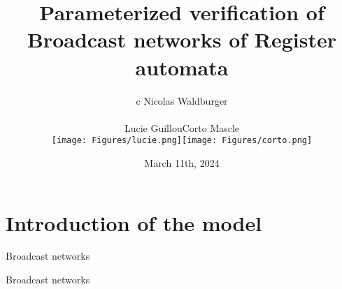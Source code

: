 \documentclass{beamer}
\begin{document}
	\title[Parameterized verification of BNRA]{Parameterized verification of Broadcast networks of Register automata}
	\date[]{March 11th, 2024\vspace{-0.5cm}}
	\author[Nicolas Waldburger]{\begin{tabular}{c} Nicolas Waldburger \\
		 \begin{tabular}{ccc}
		Lucie Guillou & Corto Mascle \\
		\texttt{[image: Figures/lucie.png]} & \texttt{[image: Figures/corto.png]} 	\end{tabular} \end{tabular} \vspace{-0.3cm}}
%	
%	
\begin{frame}
	\titlepage
\end{frame}	

\begin{frame}
	\tableofcontents
\end{frame}

\section{Introduction of the model}


\begin{frame}{Broadcast networks}
	\centering
	
\end{frame}


\begin{frame}{Broadcast networks}
	\centering
	
\end{frame}
\end{document}
